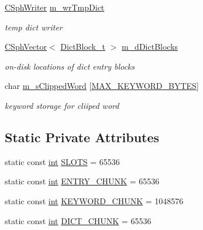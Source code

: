 \begin{DoxyCompactItemize}
\hyperlink{classCSphWriter}{C\-Sph\-Writer} \hyperlink{classCSphDictKeywords_a0c0584204b14648d1c1ba190cc7cb49a}{m\-\_\-wr\-Tmp\-Dict}
\begin{DoxyCompactList}\small\item\em temp dict writer \end{DoxyCompactList}\item 
\hyperlink{classCSphVector}{C\-Sph\-Vector}$<$ \hyperlink{structCSphDictKeywords_1_1DictBlock__t}{Dict\-Block\-\_\-t} $>$ \hyperlink{classCSphDictKeywords_a5b0459374d93201a8d2fc4a169c44119}{m\-\_\-d\-Dict\-Blocks}
\begin{DoxyCompactList}\small\item\em on-\/disk locations of dict entry blocks \end{DoxyCompactList}\item 
char \hyperlink{classCSphDictKeywords_ae2910d8b3b22ec08422d4b5c7f984e9a}{m\-\_\-s\-Clipped\-Word} \mbox{[}\hyperlink{sphinx_8cpp_aeb328d19a9780d5c5defcd7e9b08239b}{M\-A\-X\-\_\-\-K\-E\-Y\-W\-O\-R\-D\-\_\-\-B\-Y\-T\-E\-S}\mbox{]}
\begin{DoxyCompactList}\small\item\em keyword storage for cliiped word \end{DoxyCompactList}\end{DoxyCompactItemize}
\subsection*{Static Private Attributes}
\begin{DoxyCompactItemize}
\item 
static const \hyperlink{sphinxexpr_8cpp_a4a26e8f9cb8b736e0c4cbf4d16de985e}{int} \hyperlink{classCSphDictKeywords_a3ac7bc30b9bf83c02625ef675c5a4c82}{S\-L\-O\-T\-S} = 65536
\item 
static const \hyperlink{sphinxexpr_8cpp_a4a26e8f9cb8b736e0c4cbf4d16de985e}{int} \hyperlink{classCSphDictKeywords_abbfdf8e6eeab873e5e66b5a8ceb6d244}{E\-N\-T\-R\-Y\-\_\-\-C\-H\-U\-N\-K} = 65536
\item 
static const \hyperlink{sphinxexpr_8cpp_a4a26e8f9cb8b736e0c4cbf4d16de985e}{int} \hyperlink{classCSphDictKeywords_afaa811c6a9c346496846a6128558cb47}{K\-E\-Y\-W\-O\-R\-D\-\_\-\-C\-H\-U\-N\-K} = 1048576
\item 
static const \hyperlink{sphinxexpr_8cpp_a4a26e8f9cb8b736e0c4cbf4d16de985e}{int} \hyperlink{classCSphDictKeywords_a255dfc91a949e77fc562e9379f125add}{D\-I\-C\-T\-\_\-\-C\-H\-U\-N\-K} = 65536
\end{DoxyCompactItemize}
